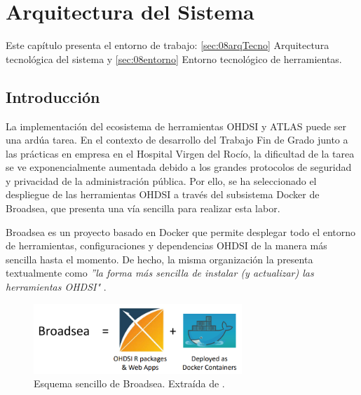 \chapter{Arquitectura del Sistema}\label{cap:08arquitectura}

Este capítulo presenta el entorno de trabajo: \ref{sec:08arqTecno} Arquitectura tecnológica del sistema y \ref{sec:08entorno} Entorno tecnológico de herramientas.

\section{Introducción}

La implementación del ecosistema de herramientas OHDSI y ATLAS puede ser una ardúa tarea. En el contexto de desarrollo del Trabajo Fin de Grado junto a las prácticas en empresa en el Hospital Virgen del Rocío, la dificultad de la tarea se ve exponencialmente aumentada debido a los grandes protocolos de seguridad y privacidad de la administración pública. Por ello, se ha seleccionado el despliegue de las herramientas OHDSI a través del subsistema Docker de Broadsea, que presenta una vía sencilla para realizar esta labor. 

Broadsea es un proyecto basado en Docker que permite desplegar todo el entorno de herramientas, configuraciones y dependencias OHDSI de la manera más sencilla hasta el momento. De hecho, la misma organización la presenta textualmente como \textit{''la forma más sencilla de instalar (y actualizar) las herramientas OHDSI"} \cite{Broadsea3PDF}. 

\begin{figure}[H]
    \centering
    \includegraphics[width=0.70\textwidth]{figures/broadseaEq.png}
    \caption{Esquema sencillo de Broadsea. Extraída de \cite{Broadsea3PPTX}.}
    \label{fig:broadseaEq}
\end{figure}

